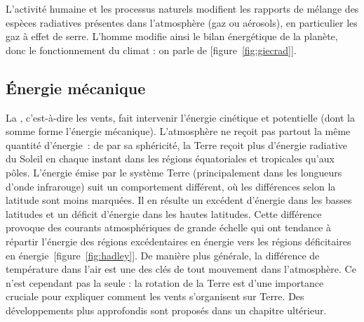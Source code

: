 \sk
L'activité humaine et les processus naturels modifient les rapports de mélange des espèces radiatives présentes dans l'atmosphère (gaz ou aérosols), en particulier les gaz à effet de serre. L'homme modifie ainsi le bilan énergétique de la planète, donc le fonctionnement du climat : on parle de  [figure~\ref{fig:giecrad}].


\sk
\subsection{\'Energie mécanique}

La , c'est-à-dire les vents, fait intervenir l'énergie cinétique et potentielle (dont la somme forme l'énergie mécanique). L'atmosphère ne reçoit pas partout la même quantité d'énergie~: de par sa sphéricité, la Terre reçoit plus d'énergie radiative du Soleil en chaque instant dans les régions équatoriales et tropicales qu'aux pôles. L'énergie émise par le système Terre (principalement dans les longueurs d'onde infrarouge) suit un comportement différent, où les différences selon la latitude sont moins marquées. Il en résulte un excédent d'énergie dans les basses latitudes et un déficit d'énergie dans les hautes latitudes. Cette différence provoque des courants atmosphériques de grande échelle qui ont tendance à répartir l'énergie des régions excédentaires en énergie vers les régions déficitaires en énergie~[figure~\ref{fig:hadley}]. De manière plus générale, la différence de température dans l'air est une des clés de tout mouvement dans l'atmosphère. Ce n'est cependant pas la seule : la rotation de la Terre est d'une importance cruciale pour expliquer comment les vents s'organisent sur Terre. Des développements plus approfondis sont proposés dans un chapitre ultérieur.

